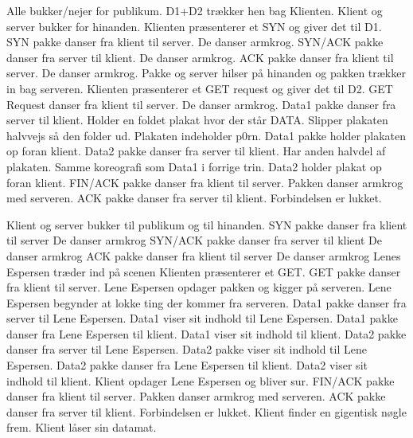\documentclass[a4paper,11pt]{article}
\begin{document}
  
\begin{sketch}


 Alle bukker/nejer for publikum.
		D1+D2 trækker hen bag Klienten.
		Klient og server bukker for hinanden.
 Klienten præsenterer et SYN og giver det til D1.
 SYN pakke danser fra klient til server.
		De danser armkrog.
 SYN/ACK pakke danser fra server til klient.
		De danser armkrog.
 ACK pakke danser fra klient til server.
		De danser armkrog.
 Pakke og server hilser på hinanden og pakken trækker in bag serveren.
 Klienten præsenterer et GET request og giver det til D2.
 GET Request danser fra klient til server.
		De danser armkrog.
 Data1 pakke danser fra server til klient.
		Holder en foldet plakat hvor der står DATA.
		Slipper plakaten halvvejs så den folder ud. Plakaten indeholder p0rn.
 Data1 pakke holder plakaten op foran klient.
		Data2 pakke danser fra server til klient.
		Har anden halvdel af plakaten.
		Samme koreografi som Data1 i forrige trin.
 Data2 holder plakat op foran klient.
		FIN/ACK pakke danser fra klient til server.
		Pakken danser armkrog med serveren.
 ACK pakke danser fra server til klient.
		Forbindelsen er lukket.

 Klient og server bukker til publikum og til hinanden.
 SYN pakke danser fra klient til server
		De danser armkrog
 SYN/ACK pakke danser fra server til klient
		De danser armkrog
 ACK pakke danser fra klient til server
		De danser armkrog
		Lenes Espersen træder ind på scenen
 Klienten præsenterer et GET.
 GET pakke danser fra klient til server.
		Lene Espersen opdager pakken og kigger på serveren.
		Lene Espersen begynder at lokke ting der kommer fra serveren.
 Data1 pakke danser fra server til Lene Espersen.
		Data1 viser sit indhold til Lene Espersen.
 Data1 pakke danser fra Lene Espersen til klient.
		Data1 viser sit indhold til klient.
		Data2 pakke danser fra server til Lene Espersen.
		Data2 pakke viser sit indhold til Lene Espersen.
 Data2 pakke danser fra Lene Espersen til klient.
		Data2 viser sit indhold til klient.
 Klient opdager Lene Espersen og bliver sur.
		FIN/ACK pakke danser fra klient til server.
		Pakken danser armkrog med serveren.
 ACK pakke danser fra server til klient.
		Forbindelsen er lukket.
 Klient finder en gigentisk nøgle frem.
	Klient låser sin datamat.



\end{sketch}
\end{document}
